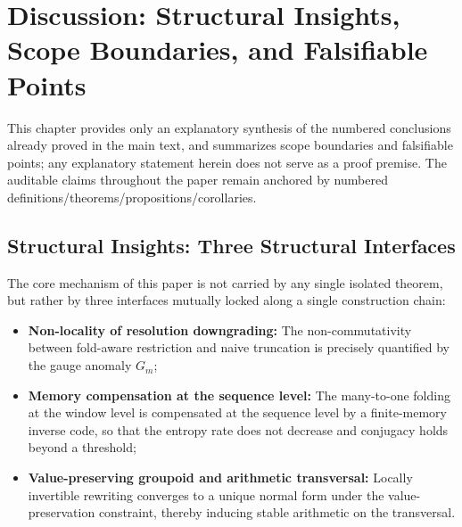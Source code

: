 \section{Discussion: Structural Insights, Scope Boundaries, and Falsifiable Points}\label{sec:discussion}

This chapter provides only an explanatory synthesis of the numbered conclusions already proved in the main text, and summarizes scope boundaries and falsifiable points; any explanatory statement herein does not serve as a proof premise. The auditable claims throughout the paper remain anchored by numbered definitions/theorems/propositions/corollaries.

\subsection{Structural Insights: Three Structural Interfaces}\label{subsec:structural-insights}
The core mechanism of this paper is not carried by any single isolated theorem, but rather by three interfaces mutually locked along a single construction chain:
\begin{itemize}
  \item \textbf{Non-locality of resolution downgrading:} The non-commutativity between fold-aware restriction and naive truncation is precisely quantified by the gauge anomaly \(G_m\);
  \item \textbf{Memory compensation at the sequence level:} The many-to-one folding at the window level is compensated at the sequence level by a finite-memory inverse code, so that the entropy rate does not decrease and conjugacy holds beyond a threshold;
  \item \textbf{Value-preserving groupoid and arithmetic transversal:} Locally invertible rewriting converges to a unique normal form under the value-preservation constraint, thereby inducing stable arithmetic on the transversal.
\end{itemize}
